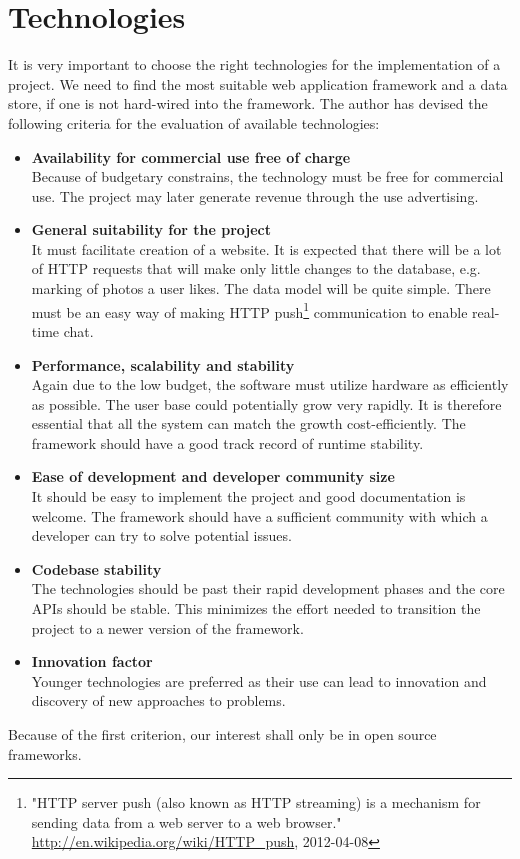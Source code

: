 \documentclass[12pt,oneside]{fithesis}
\begin{document}
\section{Technologies}
	It is very important to choose the right technologies for the implementation of a project. We need to find the most suitable web application framework and a data store, if one is not hard-wired into the framework. The author has devised the following criteria for the evaluation of available technologies:
	\begin{itemize}
		\item \textbf{Availability for commercial use free of charge}\\
			Because of budgetary constrains, the technology must be free for commercial use. The project may later generate revenue through the use advertising.
		\item \textbf{General suitability for the project}\\
			It must facilitate creation of a website. It is expected that there will be a lot of HTTP requests that will make only little changes to the database, e.g. marking of photos a user likes. The data model will be quite simple. There must be an easy way of making HTTP push\footnote{"HTTP server push (also known as HTTP streaming) is a mechanism for sending data from a web server to a web browser." \url{http://en.wikipedia.org/wiki/HTTP_push}, {2012-04-08}} communication to enable real-time chat. 
		\item \textbf{Performance, scalability and stability}\\
			Again due to the low budget, the software must utilize hardware as efficiently as possible. The user base could potentially grow very rapidly. It is therefore essential that all the system can match the growth cost-efficiently. The framework should have a good track record of runtime stability.
		\item \textbf{Ease of development and developer community size}\\
			It should be easy to implement the project and good documentation is welcome. The framework should have a sufficient community with which a developer can try to solve potential issues.
		\item \textbf{Codebase stability}\\
			The technologies should be past their rapid development phases and the core APIs should be stable. This minimizes the effort needed to transition the project to a newer version of the framework. 
		\item \textbf{Innovation factor}\\
			Younger technologies are preferred as their use can lead to innovation and discovery of new approaches to problems.
	\end{itemize}
	Because of the first criterion, our interest shall only be in open source frameworks.
\end{document}
